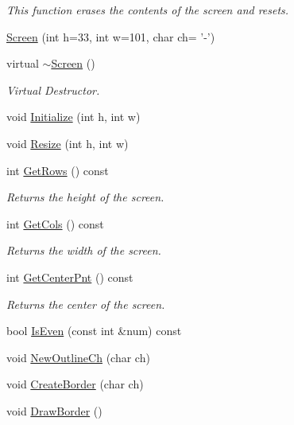 \begin{DoxyCompactItemize}
\begin{DoxyCompactList}\small\item\em This function erases the contents of the screen and resets. \end{DoxyCompactList}\item 
\hyperlink{classScreen_a932b81c3d221d644cc40ffe9003515a5}{Screen} (int h=33, int w=101, char ch= '-\/')
\item 
\hypertarget{classScreen_a0bc1a2ceaee4a245e0d31822ea0643bd}{virtual \hyperlink{classScreen_a0bc1a2ceaee4a245e0d31822ea0643bd}{$\sim$\-Screen} ()}\label{classScreen_a0bc1a2ceaee4a245e0d31822ea0643bd}

\begin{DoxyCompactList}\small\item\em Virtual Destructor. \end{DoxyCompactList}\item 
void \hyperlink{classScreen_a455b38b1ac9b18bd67ecd2e056dff909}{Initialize} (int h, int w)
\item 
void \hyperlink{classScreen_a11f9842c836301989f7c3d84eb043700}{Resize} (int h, int w)
\item 
\hypertarget{classScreen_aa12cc4ea36f5d2ac98b3c7334616acbc}{int \hyperlink{classScreen_aa12cc4ea36f5d2ac98b3c7334616acbc}{Get\-Rows} () const }\label{classScreen_aa12cc4ea36f5d2ac98b3c7334616acbc}

\begin{DoxyCompactList}\small\item\em Returns the height of the screen. \end{DoxyCompactList}\item 
\hypertarget{classScreen_a223cd8821b2b8006c61545ff41aa0091}{int \hyperlink{classScreen_a223cd8821b2b8006c61545ff41aa0091}{Get\-Cols} () const }\label{classScreen_a223cd8821b2b8006c61545ff41aa0091}

\begin{DoxyCompactList}\small\item\em Returns the width of the screen. \end{DoxyCompactList}\item 
\hypertarget{classScreen_a95daa612c5ec6a8018b89cfc2d785e27}{int \hyperlink{classScreen_a95daa612c5ec6a8018b89cfc2d785e27}{Get\-Center\-Pnt} () const }\label{classScreen_a95daa612c5ec6a8018b89cfc2d785e27}

\begin{DoxyCompactList}\small\item\em Returns the center of the screen. \end{DoxyCompactList}\item 
bool \hyperlink{classScreen_af7a18ec4e53fb371293e9ebcc23b7e2b}{Is\-Even} (const int \&num) const 
\item 
void \hyperlink{classScreen_a27dcfac6e64ab72059d0801dd9714d7a}{New\-Outline\-Ch} (char ch)
\item 
void \hyperlink{classScreen_a2ba1e54cb2fee7f246a25aed46c3ff3f}{Create\-Border} (char ch)
\item 
\hypertarget{classScreen_a146a94183c6c610ae8a619521fc9d102}{void \hyperlink{classScreen_a146a94183c6c610ae8a619521fc9d102}{Draw\-Border} ()}\label{classScreen_a146a94183c6c610ae8a619521fc9d102}


\end{DoxyCompactItemize}
